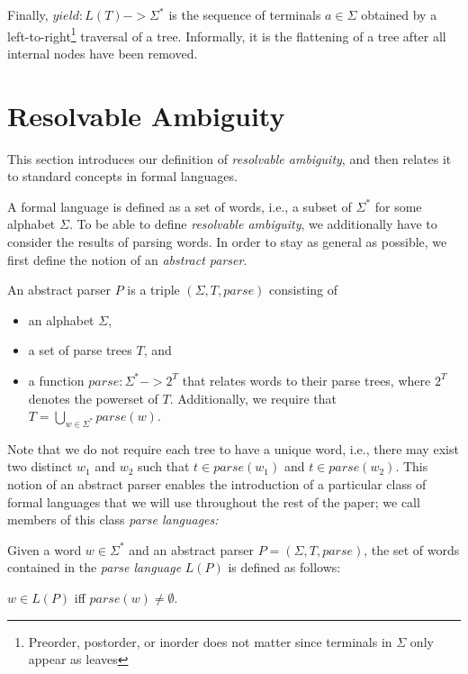 \documentclass[runningheads]{llncs}
\newcommand{\T}{\Sigma} %
\newcommand{\parse}{\mathit{parse}} %
\begin{document}
Finally, $yield : L(T) -> \T^{*}$ is the sequence of terminals $a \in \T$ obtained by a left-to-right\footnote{Preorder, postorder, or inorder does not matter since terminals in $\T$ only appear as leaves} traversal of a tree. Informally, it is the flattening of a tree after all internal nodes have been removed.

\section{Resolvable Ambiguity} \label{sec:resolvable-definition}

This section introduces our definition of \emph{resolvable ambiguity}, and then relates it to standard concepts in formal languages.

A formal language is defined as a set of words, i.e., a subset of $\T^{*}$ for some alphabet $\T$. To be able to define \emph{resolvable ambiguity}, we additionally have to consider the results of parsing words. In order to stay as general as possible, we first define the notion of an \emph{abstract parser}.

\begin{definition}
  An abstract parser $P$ is a triple $(\T, T, \parse)$ consisting of
\begin{itemize}
\item an alphabet $\T$,
\item a set of parse trees $T$, and
\item a function $\parse : \T^{*} -> 2^T$ that relates words to their parse trees, where $2^T$ denotes the powerset of $T$. Additionally, we require that $T = \bigcup_{w \in \T^{*}} \parse(w)$.
\end{itemize}
\end{definition}

\noindent Note that we do not require each tree to have a unique word, i.e., there may exist two distinct $w_1$ and $w_2$ such that $t \in \parse(w_1)$ and $t \in \parse(w_2)$. This notion of an abstract parser enables the introduction of a particular class of formal languages that we will use throughout the rest of the paper; we call members of this class \emph{parse languages:}

\begin{definition}
  Given a word $w \in \T^{*}$ and an abstract parser $P = (\T, T,
  \parse)$, the set of words contained in the \emph{parse language}
  $L(P)$ is defined as follows:

  $w \in L(P)$ iff $\parse(w) \neq \emptyset$.
\end{definition}
\end{document}
